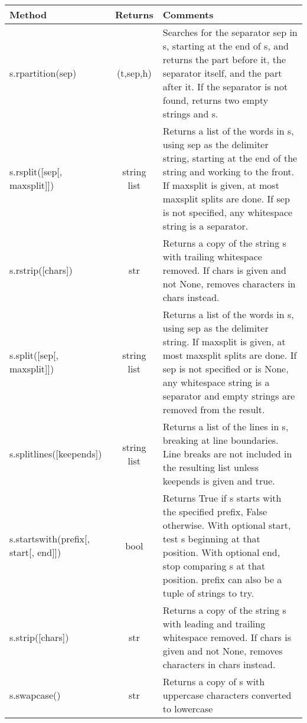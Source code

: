 \begin{center}
{\small
\begin{tabular}{|l|c|p{2.2in}|} \hline
{\bf Method} & {\bf Returns} & {\bf Comments} \\ \hline\hline 

       s.rpartition(sep) & (t,sep,h)
&     
       Searches for the separator sep in s, starting at the end of s, and returns
       the part before it, the separator itself, and the part after it.  If the
       separator is not found, returns two empty strings and s.
\\ \hline
       s.rsplit([sep[, maxsplit]]) & string list
&       
       Returns a list of the words in s, using sep as the
       delimiter string, starting at the end of the string and
       working to the front.  If maxsplit is given, at most maxsplit
       splits are done. If sep is not specified, any whitespace string
       is a separator.
\\ \hline
       s.rstrip([chars]) & str
&       
       Returns a copy of the string s with trailing whitespace removed.
       If chars is given and not None, removes characters in chars instead.
\\ \hline
       s.split([sep[, maxsplit]]) & string list
&    
       Returns a list of the words in s, using sep as the
       delimiter string.  If maxsplit is given, at most maxsplit
       splits are done. If sep is not specified or is None, any
       whitespace string is a separator and empty strings are
       removed from the result.
\\ \hline
       s.splitlines([keepends]) & string list
&       
       Returns a list of the lines in s, breaking at line boundaries.
       Line breaks are not included in the resulting list unless keepends
       is given and true.
\\ \hline
       s.startswith(prefix[, start[, end]]) & bool
&       
       Returns True if s starts with the specified prefix, False otherwise.
       With optional start, test s beginning at that position.
       With optional end, stop comparing s at that position.
       prefix can also be a tuple of strings to try.
\\ \hline
       s.strip([chars]) & str
&       
       Returns a copy of the string s with leading and trailing
       whitespace removed.
       If chars is given and not None, removes characters in chars instead.
\\ \hline
       s.swapcase() & str
&       
       Returns a copy of s with uppercase characters converted to lowercase

\end{tabular}}
\end{center}
